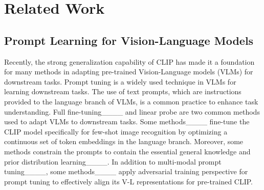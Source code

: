 \section{Related Work}
\subsection{Prompt Learning for Vision-Language Models}
Recently, the strong generalization capability of CLIP has made it a foundation for many methods in adapting pre-trained Vision-Language models (VLMs) for downstream tasks. 
Prompt tuning is a widely used technique in VLMs for learning downstream tasks. 
The use of text prompts, which are instructions provided to the language branch of VLMs, is a common practice to enhance task understanding. Full fine-tuning____ and linear probe are two common methods used to adapt VLMs to downstream tasks. %
Some methods____ fine-tune the CLIP model specifically for few-shot image recognition by optimizing a continuous set of token embeddings in the language branch. 
Moreover, some methods
constrain the prompts to contain the essential general knowledge and prior distribution learning____. 
In addition to multi-modal prompt tuning____, some methods____ apply adversarial training perspective for prompt tuning to effectively align its V-L representations for pre-trained CLIP.